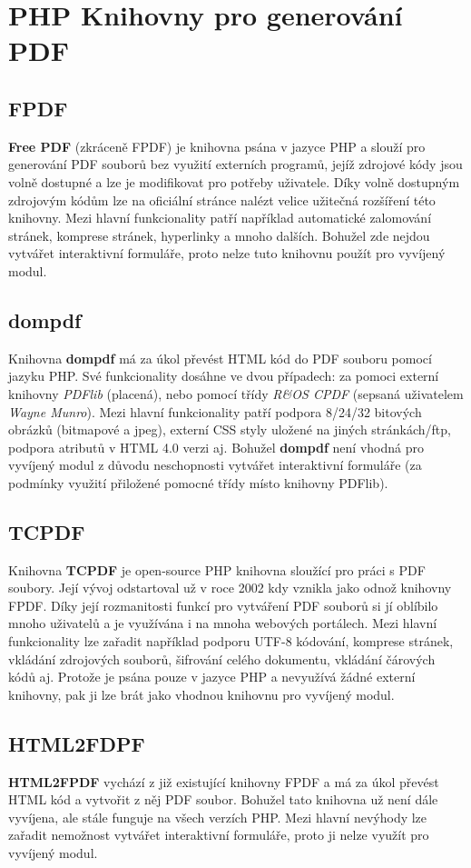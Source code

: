\section{PHP Knihovny pro generování PDF}
\subsection{FPDF}
\textbf{Free PDF} (zkráceně FPDF) je knihovna psána v jazyce PHP a slouží pro generování PDF souborů bez využití externích programů, jejíž zdrojové kódy jsou volně dostupné a lze je modifikovat pro potřeby uživatele. Díky volně dostupným zdrojovým kódům lze na oficiální stránce nalézt velice užitečná rozšíření této knihovny. Mezi hlavní funkcionality patří například automatické zalomování stránek, komprese stránek, hyperlinky a mnoho dalších. Bohužel zde nejdou vytvářet interaktivní formuláře, proto nelze tuto knihovnu použít pro vyvíjený modul.
\subsection{dompdf}
Knihovna \textbf{dompdf} má za úkol převést HTML kód do PDF souboru pomocí jazyku PHP. Své funkcionality dosáhne ve dvou případech: za pomoci externí knihovny \textit{PDFlib} (placená), nebo pomocí třídy \textit{R\&OS CPDF} (sepsaná uživatelem \textit{Wayne Munro}). Mezi hlavní funkcionality patří podpora 8/24/32 bitových obrázků (bitmapové a jpeg), externí CSS styly uložené na jiných stránkách/ftp, podpora atributů v HTML 4.0 verzi aj. Bohužel \textbf{dompdf} není vhodná pro vyvíjený modul z důvodu neschopnosti vytvářet interaktivní formuláře (za podmínky využití přiložené pomocné třídy místo knihovny PDFlib).
\subsection{TCPDF} \label{subsec:tcpdf}
Knihovna \textbf{TCPDF} je open-source PHP knihovna sloužící pro práci s PDF soubory. Její vývoj odstartoval už v roce 2002 kdy vznikla jako odnož knihovny FPDF. Díky její rozmanitosti funkcí pro vytváření PDF souborů si jí oblíbilo mnoho uživatelů a je využívána i na mnoha webových portálech. Mezi hlavní funkcionality lze zařadit například podporu UTF-8 kódování, komprese stránek, vkládání zdrojových souborů, šifrování celého dokumentu, vkládání čárových kódů  aj. Protože je psána pouze v jazyce PHP a nevyužívá žádné externí knihovny, pak ji lze brát jako vhodnou knihovnu pro vyvíjený modul.
\subsection{HTML2FDPF}
\textbf{HTML2FPDF} vychází z již existující knihovny FPDF a má za úkol převést HTML kód a vytvořit z něj PDF soubor. Bohužel tato knihovna už není dále vyvíjena, ale stále funguje na všech verzích PHP. Mezi hlavní nevýhody lze zařadit nemožnost vytvářet interaktivní formuláře, proto ji nelze využít pro vyvíjený modul.
